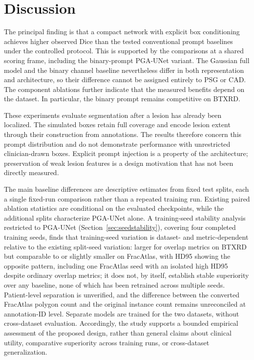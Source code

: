 \section{Discussion}
\label{sec:discussion}
The principal finding is that a compact network with explicit box conditioning achieves higher observed Dice than the tested conventional prompt baselines under the controlled protocol. This is supported by the comparisons at a shared scoring frame, including the binary-prompt PGA-UNet variant. The Gaussian full model and the binary channel baseline nevertheless differ in both representation and architecture, so their difference cannot be assigned entirely to PSG or CAD. The component ablations further indicate that the measured benefits depend on the dataset. In particular, the binary prompt remains competitive on BTXRD.

These experiments evaluate segmentation after a lesion has already been localized. The simulated boxes retain full coverage and encode lesion extent through their construction from annotations. The results therefore concern this prompt distribution and do not demonstrate performance with unrestricted clinician-drawn boxes. Explicit prompt injection is a property of the architecture; preservation of weak lesion features is a design motivation that has not been directly measured.

The main baseline differences are descriptive estimates from fixed test splits, each a single fixed-run comparison rather than a repeated training run. Existing paired ablation statistics are conditional on the evaluated checkpoints, while the additional splits characterize PGA-UNet alone. A training-seed stability analysis restricted to PGA-UNet (Section~\ref{sec:seedstability}), covering four completed training seeds, finds that training-seed variation is dataset- and metric-dependent relative to the existing split-seed variation: larger for overlap metrics on BTXRD but comparable to or slightly smaller on FracAtlas, with HD95 showing the opposite pattern, including one FracAtlas seed with an isolated high HD95 despite ordinary overlap metrics; it does not, by itself, establish stable superiority over any baseline, none of which has been retrained across multiple seeds. Patient-level separation is unverified, and the difference between the converted FracAtlas polygon count and the original instance count remains unreconciled at annotation-ID level. Separate models are trained for the two datasets, without cross-dataset evaluation. Accordingly, the study supports a bounded empirical assessment of the proposed design, rather than general claims about clinical utility, comparative superiority across training runs, or cross-dataset generalization.
